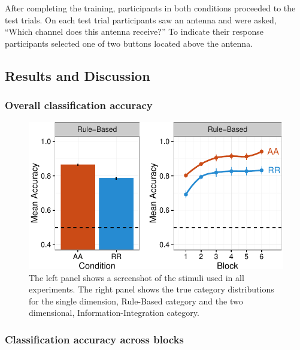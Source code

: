 \documentclass[10pt, letterpaper]{article}
\newenvironment{CodeChunk}{}{}
\begin{document}
After completing the training, participants in both conditions proceeded
to the test trials. On each test trial participants saw an antenna and
were asked, ``Which channel does this antenna receive?'' To indicate
their response participants selected one of two buttons located above
the antenna.

\subsection{Results and Discussion}\label{results-and-discussion}

\subsubsection{Overall classification
accuracy}\label{overall-classification-accuracy}

\begin{CodeChunk}
\captionsetup{width=0.8\textwidth}\begin{figure}[h]

{\centering \includegraphics{figs/exp1a_acc-1} 

}

\caption[The left panel shows a screenshot of the stimuli used in all experiments]{The left panel shows a screenshot of the stimuli used in all experiments. The right panel shows the true category distributions for the single dimension, Rule-Based category and the two dimensional, Information-Integration category.}\label{fig:exp1a_acc}
\end{figure}
\end{CodeChunk}

\subsubsection{Classification accuracy across
blocks}\label{classification-accuracy-across-blocks}
\end{document}
